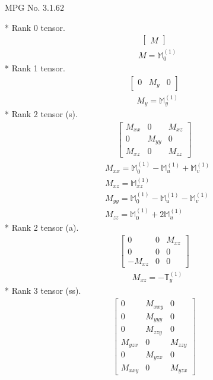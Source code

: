 \documentclass[fleqn,8pt,landscape]{jsarticle}
\begin{document}
\setcounter{MaxMatrixCols}{32}

\renewcommand{\tablename}{Table~}
\renewcommand{\figurename}{Figure~}
\begin{center}
\LARGE
MPG No. 3.1.6\quad$2$
\end{center}
* Rank 0 tensor.
\begin{align*}
\begin{bmatrix} M \end{bmatrix}
\end{align*}
\begin{align*}
& M = \mathbb{M}_{0}^{(1)}
\end{align*}
* Rank 1 tensor.
\begin{align*}
\begin{bmatrix} 0 & M_{y} & 0 \end{bmatrix}
\end{align*}
\begin{align*}
& M_{y} = \mathbb{M}_{y}^{(1)}
\end{align*}
* Rank 2 tensor (s).
\begin{align*}
\begin{bmatrix} M_{xx} & 0 & M_{xz} \\ 0 & M_{yy} & 0 \\ M_{xz} & 0 & M_{zz} \end{bmatrix}
\end{align*}
\begin{align*}
& M_{xx} = \mathbb{M}_{0}^{(1)} - \mathbb{M}_{u}^{(1)} + \mathbb{M}_{v}^{(1)} \\
& M_{xz} = \mathbb{M}_{xz}^{(1)} \\
& M_{yy} = \mathbb{M}_{0}^{(1)} - \mathbb{M}_{u}^{(1)} - \mathbb{M}_{v}^{(1)} \\
& M_{zz} = \mathbb{M}_{0}^{(1)} + 2 \mathbb{M}_{u}^{(1)}
\end{align*}
* Rank 2 tensor (a).
\begin{align*}
\begin{bmatrix} 0 & 0 & M_{xz} \\ 0 & 0 & 0 \\ - M_{xz} & 0 & 0 \end{bmatrix}
\end{align*}
\begin{align*}
& M_{xz} = - \mathbb{T}_{y}^{(1)}
\end{align*}
* Rank 3 tensor (ss).
\begin{align*}
\begin{bmatrix} 0 & M_{xxy} & 0 \\ 0 & M_{yyy} & 0 \\ 0 & M_{zzy} & 0 \\ M_{yzx} & 0 & M_{zzy} \\ 0 & M_{yzx} & 0 \\ M_{xxy} & 0 & M_{yzx} \end{bmatrix}
\end{align*}
\end{document}

